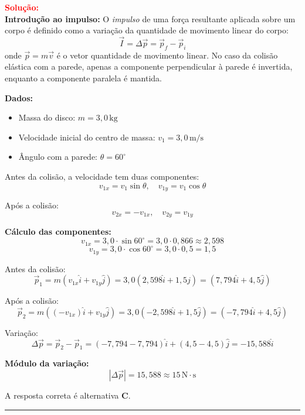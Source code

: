 \documentclass[a4paper,12pt]{article}
\begin{document}
\begin{flushleft}
\textcolor{red}{\textbf{Solução:}}\\

\textbf{Introdução ao impulso:}  
O \textit{impulso} de uma força resultante aplicada sobre um corpo é definido como a variação da quantidade de movimento linear do corpo:  
\[
\vec{I} = \Delta\vec{p} = \vec{p}_f - \vec{p}_i
\]
onde $\vec{p} = m\vec{v}$ é o vetor quantidade de movimento linear.  
No caso da colisão elástica com a parede, apenas a componente perpendicular à parede é invertida, enquanto a componente paralela é mantida.

\vspace{0.3cm}

\textbf{Dados:}
\begin{itemize}
\item Massa do disco: $m = 3{,}0\,\mathrm{kg}$
\item Velocidade inicial do centro de massa: $v_1 = 3{,}0\,\mathrm{m/s}$
\item Ângulo com a parede: $\theta = 60^\circ$
\end{itemize}

Antes da colisão, a velocidade tem duas componentes:
\[
v_{1x} = v_1\sin\theta, \quad v_{1y} = v_1\cos\theta
\]

Após a colisão:
\[
v_{2x} = -v_{1x}, \quad v_{2y} = v_{1y}
\]

\textbf{Cálculo das componentes:}
\[
v_{1x} = 3{,}0\cdot\sin 60^\circ = 3{,}0\cdot 0{,}866 \approx 2{,}598
\]
\[
v_{1y} = 3{,}0\cdot\cos 60^\circ = 3{,}0\cdot 0{,}5 = 1{,}5
\]

Antes da colisão:
\[
\vec{p}_1 = m(v_{1x}\hat{i} + v_{1y}\hat{j}) = 3{,}0(2{,}598\hat{i} + 1{,}5\hat{j}) = (7{,}794\hat{i} + 4{,}5\hat{j})
\]

Após a colisão:
\[
\vec{p}_2 = m((-v_{1x})\hat{i} + v_{1y}\hat{j}) = 3{,}0(-2{,}598\hat{i} + 1{,}5\hat{j}) = (-7{,}794\hat{i} + 4{,}5\hat{j})
\]

Variação:
\[
\Delta\vec{p} = \vec{p}_2 - \vec{p}_1 = (-7{,}794 - 7{,}794)\hat{i} + (4{,}5 - 4{,}5)\hat{j} = -15{,}588\hat{i}
\]

\textbf{Módulo da variação:}
\[
|\Delta\vec{p}| = 15{,}588 \approx 15\,\mathrm{N\cdot s}
\]

\vspace{0.3cm}

A resposta correta é alternativa \colorbox{green!50}{\textbf{C}}.

\end{flushleft}

\noindent\rule{\linewidth}{0.6pt}\\
\end{document}
